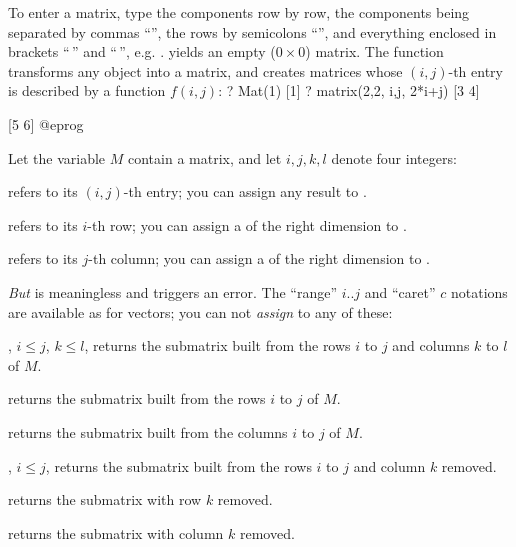 %
To enter a matrix, type the components row by row, the components being
separated by commas ``\kbd{,}'', the rows by semicolons ``\kbd{;}'', and
everything enclosed in brackets ``\kbd{[}$\,$'' and ``$\,$\kbd{]}'', e.g.
\kbd{[x,y; z,t; u,v]}. \kbd{[;]} yields an empty ($0 \times 0$) matrix. The
function  transforms any object into a matrix, and 
creates matrices whose $(i,j)$-th entry is described by a function $f(i,j)$:
\bprog
? Mat(1)
[1]
? matrix(2,2, i,j, 2*i+j)
[3 4]

[5 6]
@eprog

\noindent Let the variable $M$ contain a matrix, and let $i,j,k,l$ denote
four
integers:

\item {} refers to its $(i,j)$-th entry; you can assign any result
to .

\item {} refers to its $i$-th row; you can assign a 
of the right dimension to .

\item {} refers to its $j$-th column; you can assign a 
of the right dimension to .

\noindent \emph{But}  is meaningless and triggers an error. The
``range'' $i..j$ and ``caret'' \kbd{\pow}$c$ notations are available as for
vectors; you can not \emph{assign} to any of these:

\item {}, $i\leq j$, $k\leq l$, returns the submatrix built
from the rows $i$ to $j$ and columns $k$ to $l$ of $M$.

\item {} returns the submatrix built from the rows $i$ to
$j$ of $M$.

\item {} returns the submatrix built from the columns $i$ to
$j$ of $M$.

\item {}, $i\leq j$, returns the submatrix built
from the rows $i$ to $j$ and column $k$ removed.

\item {} returns the submatrix with row $k$ removed.

\item {} returns the submatrix with column $k$ removed.

